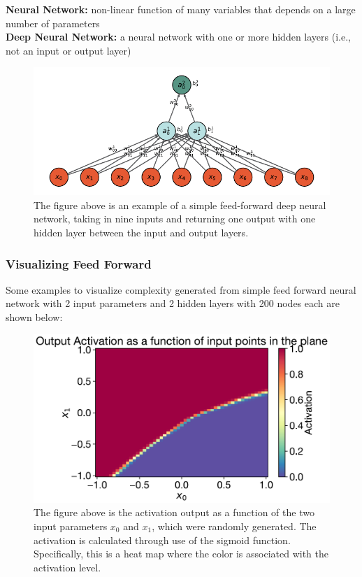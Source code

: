 \noindent \textbf{Neural Network:} non-linear function of many variables that depends on a large number of parameters \\
\textbf{Deep Neural Network:} a neural network with one or more hidden layers (i.e., not an input or output layer)

\begin{figure}[H]
\centering
\includegraphics{../figures/DNN.pdf}
\caption{The figure above is an example of a simple feed-forward deep neural network, taking in nine inputs and returning one output with one hidden layer between the input and output layers.}
\end{figure}
			
\subsubsection{Visualizing Feed Forward}
Some examples to visualize complexity generated from simple feed forward neural network with 2 input parameters and 2 hidden layers with 200 nodes each are shown below:

\begin{figure}[H]
\centering
\includegraphics[scale=0.65]{../figures/activation_heat_map.pdf}
\caption{The figure above is the activation output as a function of the two input parameters $x_0$ and $x_1$, which were randomly generated. The activation is calculated through use of the sigmoid function. Specifically, this is a heat map where the color is associated with the activation level.}
\end{figure}

